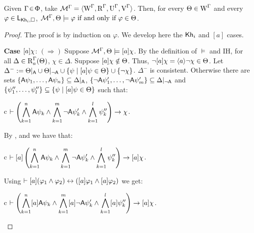 \begin{lemma}\label{tlm:cm-ults-lkhi}
Given $\Gamma \!\in\! \Upphi$, take $\mathcal{M}^\Gamma = \langle \operatorname{W}^\Gamma, \operatorname{R}^\Gamma, \operatorname{U}^\Gamma, \operatorname{V}^\Gamma \rangle$. Then, for every $\Theta \in \operatorname{W}^\Gamma$ and every $\varphi \in \mathsf{L}_{{\sf Kh}_i,\square}$,  %
$\mathcal{M}^\Gamma, \Theta \models \varphi \mbox{ if and only if } \varphi \in \Theta$.
\end{lemma}
\begin{proof}
The proof is by induction on $\varphi$. We develop here the ${\sf Kh}_i$ and $[a]$ cases.
\medskip

\noindent
\textbf{Case $[a]\chi$}: $(\Rightarrow)$ Suppose $\mathcal{M}^\Gamma,\Theta \models [a]\chi$. By the definition of $\models$ and IH, for all $\Delta \in \operatorname{R}^\Gamma_a(\Theta)$, $\chi \in \Delta$.
Suppose $[a]\chi \notin \Theta$. Thus, $\neg[a]\chi = \langle a \rangle\neg\chi \in \Theta$.
Let $\Delta^- := \Theta\vert_{{\sf A}} \cup \Theta\vert_{\lnot{\sf A}} \cup \{ \psi \mid [a]\psi \in \Theta \} \cup \{ \neg\chi \}$. $\Delta^-$ is consistent.
Otherwise there are sets $\{ {\sf A}\psi_1, \ldots, {\sf A}\psi_n \} \subseteq \Delta\vert_{{\sf A}}$, $\{ \lnot {\sf A}\psi'_1, \ldots, \lnot {\sf A}\psi'_m \} \subseteq \Delta\vert_{\lnot{\sf A}}$ and $\{ \psi''_1, \ldots, \psi''_l \} \subseteq \{ \psi \mid [a]\psi \in \Theta \}$ such that:

\begin{ctabular}{c}
$\vdash
\displaystyle
\left( \bigwedge_{k=1}^{n} {\sf A}\psi_k \land \bigwedge_{k=1}^{m} \lnot {\sf A}\psi'_k \land \bigwedge_{k=1}^{l} \psi''_k \right)
\rightarrow \chi$.
\end{ctabular}

By ,  and  we have that:

\begin{ctabular}{c}
$\vdash
\displaystyle
[a] \left( \bigwedge_{k=1}^{n} {\sf A}\psi_k \land \bigwedge_{k=1}^{m} \lnot {\sf A}\psi'_k \land \bigwedge_{k=1}^{l} \psi''_k \right)
\rightarrow [a] \chi$.
\end{ctabular}

Using $\vdash [a](\varphi_1 \wedge \varphi_2) \leftrightarrow ([a] \varphi_1 \wedge [a] \varphi_2)$ we get:

\begin{ctabular}{c}
$\vdash
\displaystyle
\left( \bigwedge_{k=1}^{n} [a]{\sf A}\psi_k \land \bigwedge_{k=1}^{m} [a]\lnot {\sf A}\psi'_k \land \bigwedge_{k=1}^{l} [a]\psi''_k \right)
\rightarrow [a] \chi$.
\end{ctabular}


\end{proof}
